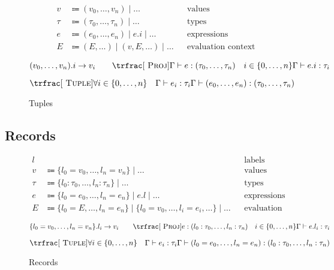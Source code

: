 \documentclass[nonacm]{acmart}
\begin{document}
\begin{figure}
  \begin{framed}
    \begin{align*}
      v    & \Coloneqq (v_0, \dots, v_n) \mid \dots             &  & \text{values}             \\
      \tau & \Coloneqq (\tau_0, \dots, \tau_n) \mid \dots       &  & \text{types}              \\
      e    & \Coloneqq (e_0, \dots, e_n) \mid e.i \mid \dots    &  & \text{expressions}        \\
      E    & \Coloneqq (E, \dots) \mid (v, E, \dots) \mid \dots &  & \text{evaluation context}
    \end{align*}

    \[
      (v_0, \dots, v_n).i \rightarrow v_i
      \qquad
      \trfrac[~\textsc{Proj}]{\Gamma \vdash e : (\tau_0, \dots, \tau_n) \quad i \in \{0, \dots, n\}}{\Gamma \vdash e.i : \tau_i}
    \]

    \[
      \trfrac[~\textsc{Tuple}]{\forall i \in \{0, \dots, n\} \quad \Gamma \vdash e_i : \tau_i}{\Gamma \vdash (e_0, \dots, e_n) : (\tau_0, \dots, \tau_n)}
    \]
  \end{framed}
  \caption{Tuples}\label{fig:tuples}
\end{figure}

\subsection{Records}

\begin{figure}
  \begin{framed}
    \begin{align*}
      l & && \text{labels} \\
      v    & \Coloneqq \{l_0 = v_0, \dots, l_n = v_n\} \mid \dots                                              &  & \text{values}             \\
      \tau & \Coloneqq \{l_0 : \tau_0, \dots, l_n : \tau_n \} \mid \dots                                       &  & \text{types}              \\
      e    & \Coloneqq \{l_0 = e_0, \dots, l_n = e_n\} \mid e.l \mid \dots                                     &  & \text{expressions}        \\
      E    & \Coloneqq  \{l_0 = E, \dots, l_n = e_n \} \mid \{l_0 = v_0, \dots, l_i = e_i, \dots \} \mid \dots &  & \text{evaluation context}
    \end{align*}

    \[
      \{l_0 = v_0, \dots, l_n = v_n\}.l_i \rightarrow v_i
      \qquad
      \trfrac[~\textsc{Proj}]{e : (l_0 : \tau_0, \dots, l_n : \tau_n) \quad i \in \{0, \dots, n\}}{\Gamma \vdash e.l_i : \tau_i}
    \]

    \[
      \trfrac[~\textsc{Tuple}]{\forall i \in \{0, \dots, n\} \quad \Gamma \vdash e_i : \tau_i}{\Gamma \vdash (l_0 = e_0, \dots, l_n = e_n) : (l_0 : \tau_0, \dots, l_n : \tau_n)}
    \]
  \end{framed}
  \caption{Records}\label{fig:records}
\end{figure}
\end{document}

